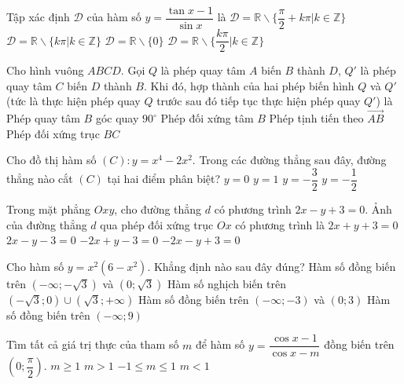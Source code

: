 \begin{ex}%
Tập xác định $\mathscr{D}$ của hàm số $y=\dfrac{\tan x -1}{\sin x}$ là
\choice
{$\mathscr{D}=\mathbb{R} \backslash \Big\{\dfrac{\pi}{2} + k\pi | k \in \mathbb{Z}\Big\}$}
{$\mathscr{D}=\mathbb{R} \backslash \Big\{ k\pi | k \in \mathbb{Z}\Big\}$}
{$\mathscr{D}=\mathbb{R} \backslash \Big\{0\Big\}$}
{\True $\mathscr{D}=\mathbb{R} \backslash \Big\{\dfrac{k\pi}{2}  | k \in \mathbb{Z}\Big\}$}
\end{ex}

\begin{ex}%
Cho hình vuông $ABCD$. Gọi $Q$ là phép quay tâm $A$ biến $B$ thành $D$, $Q'$ là phép quay tâm $C$ biến $D$ thành $B$. Khi đó, hợp thành của hai phép biến hình $Q$ và $Q'$ (tức là thực hiện phép quay $Q$ trước sau đó tiếp tục thực hiện phép quay $Q'$) là 
\choice
{Phép quay tâm $B$ góc quay $90^\circ$}
{\True Phép đối xứng tâm $B$}
{Phép tịnh tiến theo $\overrightarrow{AB}$}
{Phép đối xứng trục $BC$}
\end{ex}

\begin{ex}%
Cho đồ thị hàm  số $(C) : y=x^4-2x^2$. Trong các đường thẳng sau đây, đường thẳng nào cắt $(C)$ tại hai điểm phân biệt?
\choice
{$y=0$}
{\True $y=1$}
{$y=-\dfrac{3}{2}$}
{$y=-\dfrac{1}{2}$}
\end{ex}

\begin{ex}%
Trong mặt phẳng $Oxy$, cho đường thẳng $d$ có phương trình $2x-y+3=0$. Ảnh của đường thẳng $d$ qua phép đối xứng trục $Ox$ có phương trình là
\choice
{\True $2x+y+3=0$}
{$2x-y-3=0$}
{$-2x+y-3=0$}
{$-2x-y+3=0$}
\end{ex}

\begin{ex}%
Cho hàm số $y=x^2(6-x^2)$. Khẳng định nào sau đây đúng? 
\choice
{\True Hàm số đồng biến trên $(-\infty;-\sqrt{3})$ và $(0;\sqrt{3})$}
{Hàm số nghịch biến trên $(-\sqrt{3};0) \cup (\sqrt{3};+\infty)$}
{Hàm số đồng biến trên $(-\infty;-3)$ và $(0;3)$}
{Hàm số đồng biến trên $(-\infty;9)$}
\end{ex}

\begin{ex}%
Tìm tất cả giá trị thực của tham số $m$ để hàm số $y=\dfrac{\cos x -1}{\cos x -m}$ đồng biến trên $\left ( 0;\dfrac{\pi}{2}\right )$.
\choice
{$m \geq 1$}
{\True $m >1$}
{$-1 \leq m \leq 1 $}
{$m<1$}
\end{ex}

